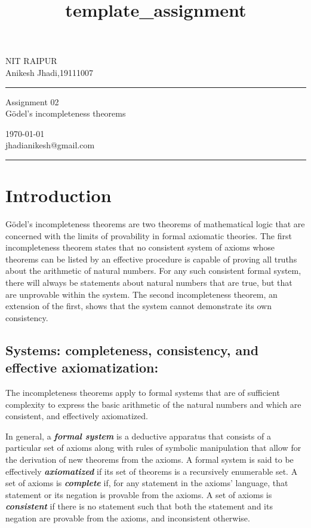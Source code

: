 \documentclass[a4paper,10pt]{article}
\begin{document}
\title{template_assignment} 
\fancyhead[C]{}
\begin{minipage}{0.295\textwidth} 
\raggedright
NIT RAIPUR\\ 
\footnotesize 
Anikesh Jhadi,19111007 
\medskip\hrule
\end{minipage}
\begin{minipage}{0.4\textwidth} 
\centering 
\large 
Assignment 02\\ 
\normalsize 
Gödel's incompleteness theorems\\ 
\end{minipage}
\begin{minipage}{0.295\textwidth} 
\raggedleft
\today\\ 
\footnotesize 
jhadianikesh@gmail.com
\medskip\hrule
\end{minipage}
\section*{Introduction}
Gödel's incompleteness theorems are two theorems of mathematical logic that are concerned with the limits of provability in formal axiomatic theories. The first incompleteness theorem states that no consistent system of axioms whose theorems can be listed by an effective procedure is capable of proving all truths about the arithmetic of natural numbers. For any such consistent formal system, there will always be statements about natural numbers that are true, but that are unprovable within the system. The second incompleteness theorem, an extension of the first, shows that the system cannot demonstrate its own consistency.  


\subsection*{Systems: completeness, consistency, and effective axiomatization:}

The incompleteness theorems apply to formal systems that are of sufficient complexity to express the basic arithmetic of the natural numbers and which are consistent, and effectively axiomatized.

In general, a \textbf{\emph{formal system}} is a deductive apparatus that consists of a particular set of axioms along with rules of symbolic manipulation that allow for the derivation of new theorems from the axioms.
A formal system is said to be effectively \textbf{\emph{axiomatized}} if its set of theorems is a recursively enumerable set.
A set of axioms is \textbf{\emph{complete}} if, for any statement in the axioms' language, that statement or its negation is provable from the axioms.
A set of axioms is \textbf{\emph{consistent}} if there is no statement such that both the statement and its negation are provable from the axioms, and inconsistent otherwise.
\end{document}

